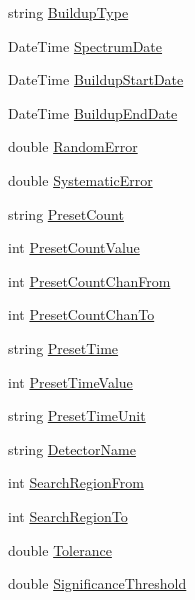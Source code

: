 \begin{DoxyCompactItemize}
\item 
string \hyperlink{class_scintilab_1_1_job_params_a1edc5d9d2cbdfaa9e7739c5d5413b61d}{Buildup\+Type}
\item 
Date\+Time \hyperlink{class_scintilab_1_1_job_params_ae4e318fc2c9f21edab93ecbe7a7ae123}{Spectrum\+Date}
\item 
Date\+Time \hyperlink{class_scintilab_1_1_job_params_aa0d62e2ed96be6935c388a3401fd1f53}{Buildup\+Start\+Date}
\item 
Date\+Time \hyperlink{class_scintilab_1_1_job_params_ad1bdea79a64a1e857b6a0f80ed3e63e7}{Buildup\+End\+Date}
\item 
double \hyperlink{class_scintilab_1_1_job_params_a71eeddf0a3f7cc812456623ab1bb7700}{Random\+Error}
\item 
double \hyperlink{class_scintilab_1_1_job_params_a555911d254285940808f15da0d1c34f6}{Systematic\+Error}
\item 
string \hyperlink{class_scintilab_1_1_job_params_a5daf75b38346ac3efc72552761d5a8ae}{Preset\+Count}
\item 
int \hyperlink{class_scintilab_1_1_job_params_a0947716fc8b02cac5ec231ab24033058}{Preset\+Count\+Value}
\item 
int \hyperlink{class_scintilab_1_1_job_params_af68fe1c3af440c7ae3f446b9467c242a}{Preset\+Count\+Chan\+From}
\item 
int \hyperlink{class_scintilab_1_1_job_params_a40e7cd069e21f40471dd0279b201356f}{Preset\+Count\+Chan\+To}
\item 
string \hyperlink{class_scintilab_1_1_job_params_aa5fcccd640c3cd1907ce19ed2067b7dc}{Preset\+Time}
\item 
int \hyperlink{class_scintilab_1_1_job_params_afeac9b178dfaa60b3e7c967ffaf3ae4e}{Preset\+Time\+Value}
\item 
string \hyperlink{class_scintilab_1_1_job_params_ac4aa75b35ca6fccbb01cb6d6df6b2f15}{Preset\+Time\+Unit}
\item 
string \hyperlink{class_scintilab_1_1_job_params_abbaa53404bec76bbacb7868c585a1bf7}{Detector\+Name}
\item 
int \hyperlink{class_scintilab_1_1_job_params_a46a6e6cb9c2a2e15c97de85a5169cb95}{Search\+Region\+From}
\item 
int \hyperlink{class_scintilab_1_1_job_params_aa348a43e8264d89a2f47c352df726fd8}{Search\+Region\+To}
\item 
double \hyperlink{class_scintilab_1_1_job_params_aa691196ec6fcf464879b00d2b844df04}{Tolerance}
\item 
double \hyperlink{class_scintilab_1_1_job_params_aed6e5e005c0907a9be1baf519cf97ea0}{Significance\+Threshold}

\end{DoxyCompactItemize}
